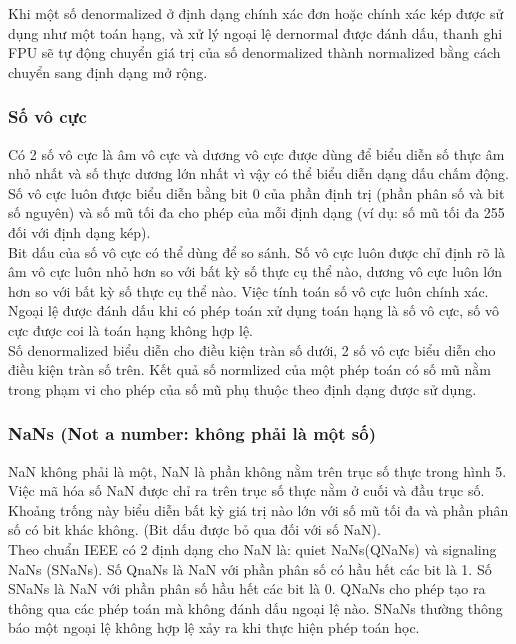 	Khi một số denormalized ở định dạng chính xác đơn hoặc chính xác kép được sử dụng như một toán hạng, và xử lý ngoại lệ dernormal được đánh dấu, thanh ghi FPU sẽ tự động chuyển giá trị của số denormalized thành normalized bằng cách chuyển sang định dạng mở rộng.

		\subsubsection*{Số vô cực}
		Có 2 số vô cực là âm vô cực và dương vô cực được dùng để biểu diễn số thực âm nhỏ nhất và số thực dương lớn nhất vì vậy có thể biểu diễn dạng dấu chấm động. Số vô cực luôn được biểu diễn bằng bit 0 của phần định trị (phần phân số và bit số nguyên) và số mũ tối đa cho phép của mỗi định dạng (ví dụ: số mũ tối đa 255 đối với định dạng kép).\\

Bit dấu của số vô cực có thể dùng để so sánh. Số vô cực luôn được chỉ định rõ là âm vô cực luôn nhỏ hơn so với bất kỳ số thực cụ thể nào, dương vô cực luôn lớn hơn so với bất kỳ số thực cụ thể nào. Việc tính toán số vô cực luôn chính xác. Ngoại lệ được đánh dấu khi có phép toán xử dụng toán hạng là số vô cực, số vô cực được coi là toán hạng không hợp lệ. \\

Số denormalized biểu diễn cho điều kiện tràn số dưới, 2 số vô cực biểu diễn cho điều kiện tràn số trên. Kết quả số normlized của một phép toán có số mũ nằm trong phạm vi cho phép của số mũ phụ thuộc theo định dạng được sử dụng.
	
		\subsubsection*{NaNs (Not a number: không phải là một số)}
		NaN không phải là một, NaN là phần không nằm trên trục số thực trong hình 5. Việc mã hóa số NaN được chỉ ra trên trục số thực nằm ở cuối và đầu trục số. Khoảng trống này biểu diễn bất kỳ giá trị nào lớn với số mũ tối đa và phần phân số có bit khác không. (Bit dấu được bỏ qua đối với số NaN).\\

	Theo chuẩn IEEE có 2 định dạng cho NaN là: quiet NaNs(QNaNs) và signaling NaNs (SNaNs). Số QnaNs là NaN với phần phân số có hầu hết các bit là 1. Số SNaNs là NaN với phần phân số hầu hết các bit là 0. QNaNs cho phép tạo ra thông qua các phép toán mà không đánh dấu ngoại lệ nào. SNaNs thường thông báo một ngoại lệ không hợp lệ xảy ra khi thực hiện phép toán học. 
	
